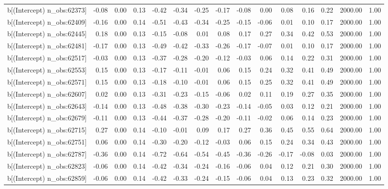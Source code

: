 \begin{table}[ht]
\begin{tabular}{rrrrrrrrrrrrrrr}
  b[(Intercept) n\_obs:62373] & -0.08 & 0.00 & 0.13 & -0.42 & -0.34 & -0.25 & -0.17 & -0.08 & 0.00 & 0.08 & 0.16 & 0.22 & 2000.00 & 1.00 \\ 
  b[(Intercept) n\_obs:62409] & -0.16 & 0.00 & 0.14 & -0.51 & -0.43 & -0.34 & -0.25 & -0.15 & -0.06 & 0.01 & 0.10 & 0.17 & 2000.00 & 1.00 \\ 
  b[(Intercept) n\_obs:62445] & 0.18 & 0.00 & 0.13 & -0.15 & -0.08 & 0.01 & 0.08 & 0.17 & 0.27 & 0.34 & 0.42 & 0.53 & 2000.00 & 1.00 \\ 
  b[(Intercept) n\_obs:62481] & -0.17 & 0.00 & 0.13 & -0.49 & -0.42 & -0.33 & -0.26 & -0.17 & -0.07 & 0.01 & 0.10 & 0.17 & 2000.00 & 1.00 \\ 
  b[(Intercept) n\_obs:62517] & -0.03 & 0.00 & 0.13 & -0.37 & -0.28 & -0.20 & -0.12 & -0.03 & 0.06 & 0.14 & 0.22 & 0.31 & 2000.00 & 1.00 \\ 
  b[(Intercept) n\_obs:62553] & 0.15 & 0.00 & 0.13 & -0.17 & -0.11 & -0.01 & 0.06 & 0.15 & 0.24 & 0.32 & 0.41 & 0.49 & 2000.00 & 1.00 \\ 
  b[(Intercept) n\_obs:62571] & 0.15 & 0.00 & 0.13 & -0.18 & -0.10 & -0.01 & 0.06 & 0.15 & 0.25 & 0.32 & 0.41 & 0.49 & 2000.00 & 1.00 \\ 
  b[(Intercept) n\_obs:62607] & 0.02 & 0.00 & 0.13 & -0.31 & -0.23 & -0.15 & -0.06 & 0.02 & 0.11 & 0.19 & 0.27 & 0.35 & 2000.00 & 1.00 \\ 
  b[(Intercept) n\_obs:62643] & -0.14 & 0.00 & 0.13 & -0.48 & -0.38 & -0.30 & -0.23 & -0.14 & -0.05 & 0.03 & 0.12 & 0.21 & 2000.00 & 1.00 \\ 
  b[(Intercept) n\_obs:62679] & -0.11 & 0.00 & 0.13 & -0.44 & -0.37 & -0.28 & -0.20 & -0.11 & -0.02 & 0.06 & 0.14 & 0.23 & 2000.00 & 1.00 \\ 
  b[(Intercept) n\_obs:62715] & 0.27 & 0.00 & 0.14 & -0.10 & -0.01 & 0.09 & 0.17 & 0.27 & 0.36 & 0.45 & 0.55 & 0.64 & 2000.00 & 1.00 \\ 
  b[(Intercept) n\_obs:62751] & 0.06 & 0.00 & 0.14 & -0.30 & -0.20 & -0.12 & -0.03 & 0.06 & 0.15 & 0.24 & 0.34 & 0.43 & 2000.00 & 1.00 \\ 
  b[(Intercept) n\_obs:62787] & -0.36 & 0.00 & 0.14 & -0.72 & -0.64 & -0.54 & -0.45 & -0.36 & -0.26 & -0.17 & -0.08 & 0.03 & 2000.00 & 1.00 \\ 
  b[(Intercept) n\_obs:62823] & -0.06 & 0.00 & 0.14 & -0.42 & -0.34 & -0.24 & -0.16 & -0.06 & 0.04 & 0.12 & 0.21 & 0.30 & 2000.00 & 1.00 \\ 
  b[(Intercept) n\_obs:62859] & -0.06 & 0.00 & 0.14 & -0.42 & -0.33 & -0.24 & -0.15 & -0.06 & 0.04 & 0.13 & 0.23 & 0.32 & 2000.00 & 1.00 \\ 

\end{tabular}
\end{table}
